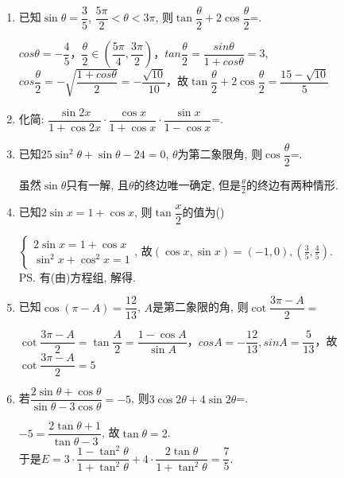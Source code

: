\begin{enumerate}

\item 已知$\sin\theta=\dfrac{3}{5}$, $\dfrac{5\pi}{2}<\theta<3\pi$, 则$\tan\dfrac{\theta}{2}+2\cos{\dfrac{\theta}{2}}$=. 
\begin{jieda}
    $cos\theta = -\dfrac{4}{5}$，$\dfrac{\theta}{2} \in (\dfrac{5\pi}{4}, \dfrac{3\pi}{2})$，$tan\dfrac{\theta}{2} = \dfrac{sin\theta}{1+cos\theta} = 3$, $cos\dfrac{\theta}{2} = -\sqrt{\dfrac{1+cos\theta}{2}} = -\dfrac{\sqrt{10}}{10}$，故$\tan\dfrac{\theta}{2}+2\cos{\dfrac{\theta}{2}} = \dfrac{15-\sqrt{10}}{5}$
\end{jieda}
\item 化简: $\dfrac{\sin2x}{1+\cos2x}\cdot\dfrac{\cos{x}}{1+\cos{x}}\cdot\dfrac{\sin{x}}{1-\cos{x}}$=. 

\item 已知$25\sin^2\theta+\sin\theta-24=0$, $\theta$为第二象限角, 则$\cos\dfrac{\theta}{2}$=. 
\begin{jieda}
虽然$\sin\theta$只有一解, 且$\theta$的终边唯一确定, 但是$\frac{\theta}{2}$的终边有两种情形. 
\end{jieda}

\item 已知$2\sin{x}=1+\cos{x}$, 则$\tan\dfrac{x}{2}$的值为\dotfill()
\begin{jieda}
$\begin{cases}
2\sin{x}=1+\cos{x}\\
\sin^2x+\cos^2x=1
\end{cases}$, 
故$(\cos{x},\sin{x})=(-1,0),(\frac{3}{5},\frac{4}{5})$. \\
\ps 有(由)方程组, 解得. 
\end{jieda}

\item  已知$\cos(\pi-A)=\dfrac{12}{13}$, $A$是第二象限的角, 则$\cot\dfrac{3\pi-A}{2}=$
\begin{jieda}
$\cot\dfrac{3\pi-A}{2}=\tan\dfrac{A}{2}=\dfrac{1-\cos{A}}{\sin{A}}$，$cosA = -\dfrac{12}{13}, sinA = \dfrac{5}{13}$，故$\cot\dfrac{3\pi-A}{2}=5$
\end{jieda}

\item 若$\dfrac{2\sin\theta+\cos\theta}{\sin\theta-3\cos\theta}=-5$, 则$3\cos2\theta+4\sin2\theta$=. 
\begin{jieda}
$-5=\dfrac{2\tan\theta+1}{\tan\theta-3}$, 故$\tan\theta=2$. \\
于是$E=3\cdot\dfrac{1-\tan^2\theta}{1+\tan^2\theta}+4\cdot\dfrac{2\tan\theta}{1+\tan^2\theta}=\dfrac{7}{5}$. 
\end{jieda}


\end{enumerate}
